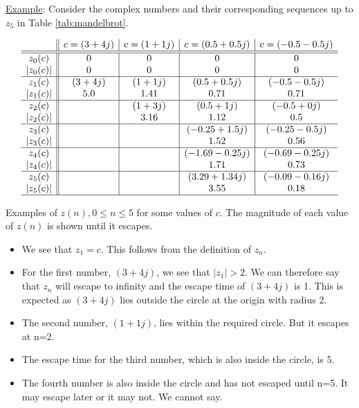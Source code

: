 \documentclass[addpoints]{exam}
\begin{document}
\begin{questions}
  \underline{Example}: Consider the complex numbers and their corresponding sequences up to $z_5$ in Table \ref{tab:mandelbrot}.
  \begin{table}
  \[
    \begin{array}{c|*{4}{|c}}
      & c=(3+4j) & c=(1+1j) & c=(0.5+0.5j) & c=(-0.5-0.5j)\\\hline\hline
      z_0(c) & 0 & 0 & 0 & 0\\
      |z_0(c)| & 0 & 0 & 0 & 0\\\hline
      z_1(c) & (3+4j) & (1+1j) & (0.5+0.5j) & (-0.5-0.5j)\\
      |z_1(c)| & 5.0 & 1.41 & 0.71 & 0.71\\\hline
      z_2(c) &  & (1+3j) & (0.5+1j) & (-0.5+0j)\\
      |z_2(c)| &  & 3.16 & 1.12 & 0.5\\\hline
      z_3(c) &  &  & (-0.25+1.5j) & (-0.25-0.5j)\\
      |z_3(c)| &  &  & 1.52 & 0.56\\\hline
      z_4(c) &  &  & (-1.69-0.25j) & (-0.69-0.25j)\\
      |z_4(c)| &  &  & 1.71 & 0.73\\\hline
      z_5(c) &  &  & (3.29+1.34j) & (-0.09-0.16j)\\
      |z_5(c)| &  &  & 3.55 & 0.18\\\hline
    \end{array}
  \]
  \caption{Examples of $z(n), 0\leq n\leq 5$ for some values of $c$. The magnitude of each value of $z(n)$ is shown until it escapes.}
  \label{tab:mandelbrot}
\end{table}
\begin{itemize}
  \item We see that $z_1=c$. This follows from the definition of $z_n$.
  \item For the first number, $(3+4j)$, we see that $|z_1|>2$. We can therefore say that $z_n$ will escape to infinity and the escape time of $(3+4j)$ is 1. This is expected as $(3+4j)$ lies outside the circle at the origin with radius 2.
  \item The second number, $(1+1j)$, lies within the required circle. But it escapes at n=2.
  \item The escape time for the third number, which is also inside the circle, is 5.
  \item The fourth number is also inside the circle and has not escaped until n=5. It may escape later or it may not. We cannot say.
  \end{itemize}
  

\end{questions}
\end{document}
